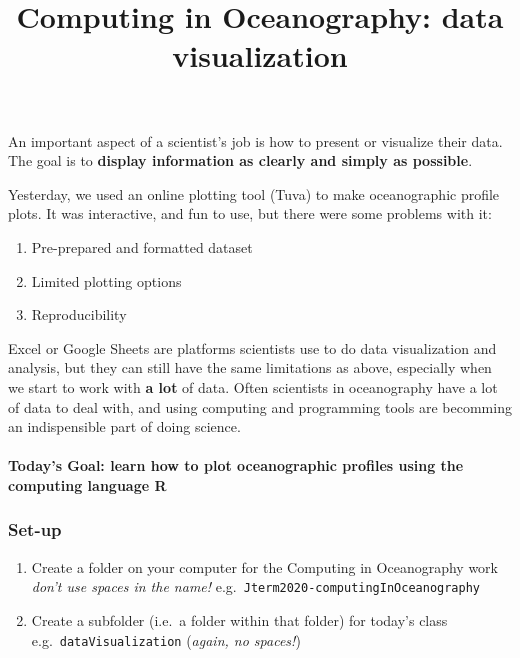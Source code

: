 \documentclass[
]{article}
\title{Computing in Oceanography: data visualization}
\author{}
\date{\vspace{-2.5em}}
\providecommand{\tightlist}{%
  \setlength{\itemsep}{0pt}\setlength{\parskip}{0pt}}
\begin{document}
\maketitle

An important aspect of a scientist's job is how to present or visualize
their data. The goal is to \textbf{display information as clearly and
simply as possible}.

Yesterday, we used an online plotting tool (Tuva) to make oceanographic
profile plots. It was interactive, and fun to use, but there were some
problems with it:

\begin{enumerate}
\def\labelenumi{\arabic{enumi}.}
\tightlist
\item
  Pre-prepared and formatted dataset
\item
  Limited plotting options
\item
  Reproducibility
\end{enumerate}

Excel or Google Sheets are platforms scientists use to do data
visualization and analysis, but they can still have the same limitations
as above, especially when we start to work with \textbf{a lot} of data.
Often scientists in oceanography have a lot of data to deal with, and
using computing and programming tools are becomming an indispensible
part of doing science.

\hypertarget{todays-goal-learn-how-to-plot-oceanographic-profiles-using-the-computing-language-r}{%
\paragraph{\texorpdfstring{\textbf{Today's Goal: learn how to plot
oceanographic profiles using the computing language
R}}{Today's Goal: learn how to plot oceanographic profiles using the computing language R}}\label{todays-goal-learn-how-to-plot-oceanographic-profiles-using-the-computing-language-r}}

\hypertarget{set-up}{%
\subsubsection{Set-up}\label{set-up}}

\begin{enumerate}
\def\labelenumi{\arabic{enumi}.}
\tightlist
\item
  Create a folder on your computer for the Computing in Oceanography
  work \emph{don't use spaces in the name!}
  e.g.~\texttt{Jterm2020-computingInOceanography}
\item
  Create a subfolder (i.e.~a folder within that folder) for today's
  class e.g.~\texttt{dataVisualization} (\emph{again, no spaces!})
\end{enumerate}
\end{document}
